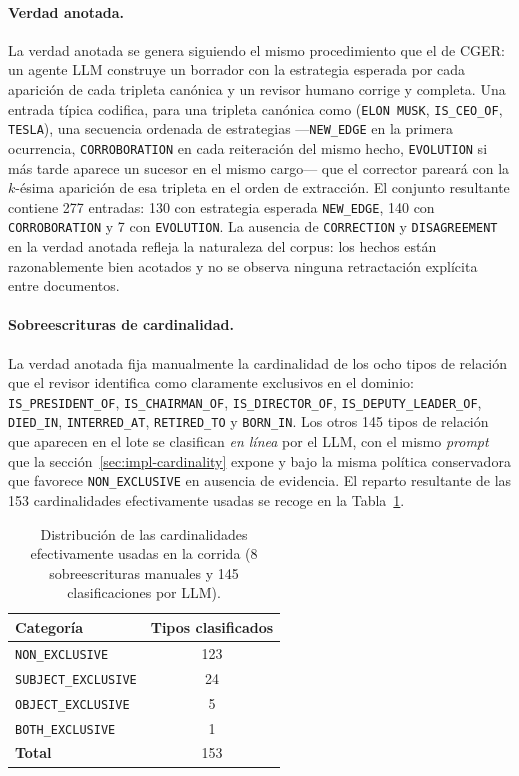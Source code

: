 \paragraph{Verdad anotada.} La verdad anotada se genera siguiendo el mismo procedimiento que el de CGER: un agente LLM construye un borrador con la estrategia esperada por cada aparición de cada tripleta canónica y un revisor humano corrige y completa. Una entrada típica codifica, para una tripleta canónica como (\texttt{ELON MUSK}, \texttt{IS\_CEO\_OF}, \texttt{TESLA}), una secuencia ordenada de estrategias ---\texttt{NEW\_EDGE} en la primera ocurrencia, \texttt{CORROBORATION} en cada reiteración del mismo hecho, \texttt{EVOLUTION} si más tarde aparece un sucesor en el mismo cargo--- que el corrector pareará con la $k$-ésima aparición de esa tripleta en el orden de extracción. El conjunto resultante contiene 277 entradas: 130 con estrategia esperada \texttt{NEW\_EDGE}, 140 con \texttt{CORROBORATION} y 7 con \texttt{EVOLUTION}. La ausencia de \texttt{CORRECTION} y \texttt{DISAGREEMENT} en la verdad anotada refleja la naturaleza del corpus: los hechos están razonablemente bien acotados y no se observa ninguna retractación explícita entre documentos.

\paragraph{Sobreescrituras de cardinalidad.} La verdad anotada fija manualmente la cardinalidad de los ocho tipos de relación que el revisor identifica como claramente exclusivos en el dominio: \texttt{IS\_PRESIDENT\_OF}, \texttt{IS\_CHAIRMAN\_OF}, \texttt{IS\_DIRECTOR\_OF}, \texttt{IS\_DEPUTY\_LEADER\_OF}, \texttt{DIED\_IN}, \texttt{INTERRED\_AT}, \texttt{RETIRED\_TO} y \texttt{BORN\_IN}. Los otros 145 tipos de relación que aparecen en el lote se clasifican \emph{en línea} por el LLM, con el mismo \emph{prompt} que la sección~\ref{sec:impl-cardinality} expone y bajo la misma política conservadora que favorece \texttt{NON\_EXCLUSIVE} en ausencia de evidencia. El reparto resultante de las 153 cardinalidades efectivamente usadas se recoge en la Tabla~\ref{tab:eval-cardinality-distribution}.

\begin{table}[h]
\centering
\small
\begin{tabular}{lc}
\hline
\textbf{Categoría} & \textbf{Tipos clasificados} \\ \hline
\texttt{NON\_EXCLUSIVE} & 123 \\
\texttt{SUBJECT\_EXCLUSIVE} & 24 \\
\texttt{OBJECT\_EXCLUSIVE} & 5 \\
\texttt{BOTH\_EXCLUSIVE} & 1 \\ \hline
\textbf{Total} & 153 \\ \hline
\end{tabular}
\caption{Distribución de las cardinalidades efectivamente usadas en la corrida (8 sobreescrituras manuales y 145 clasificaciones por LLM).}
\label{tab:eval-cardinality-distribution}
\end{table}

